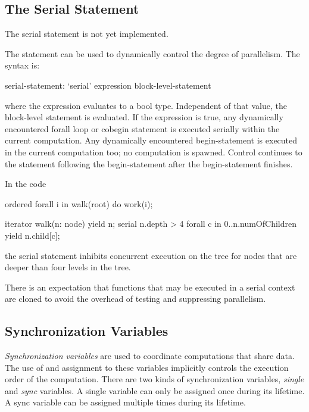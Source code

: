 \subsection{The Serial Statement}
\label{Serial}

\begin{implementation}
The serial statement is not yet implemented.
\end{implementation}

The  statement can be used to dynamically control the
degree of parallelism.  The syntax is:
\begin{syntax}
serial-statement:
  `serial' expression block-level-statement
\end{syntax}
where the expression evaluates to a bool type.  Independent of that
value, the block-level statement is evaluated. If the expression is
true, any dynamically encountered forall loop or cobegin statement is
executed serially within the current computation.  Any dynamically
encountered begin-statement is executed in the current computation
too; no computation is spawned.  Control continues to the statement
following the begin-statement after the begin-statement finishes.

\begin{example}
In the code
\begin{chapel}
ordered forall i in walk(root) do
  work(i);

iterator walk(n: node) {
  yield n;
  serial n.depth > 4 forall c in 0..n.numOfChildren {
      yield n.child[c];
  }
}
\end{chapel}
the serial statement inhibits concurrent execution on the tree for
nodes that are deeper than four levels in the tree.
\end{example}

There is an expectation that functions that may be executed in a
serial context are cloned to avoid the overhead of testing and
suppressing parallelism.

\subsection{Synchronization Variables}
\label{Synchronization_Variables}

{\em Synchronization variables} are used to coordinate computations
that share data.  The use of and assignment to these variables
implicitly controls the execution order of the computation.  There are
two kinds of synchronization variables, {\em single} and {\em sync}
variables.  A single variable can only be assigned once during its
lifetime.  A sync variable can be assigned multiple times during its
lifetime.

